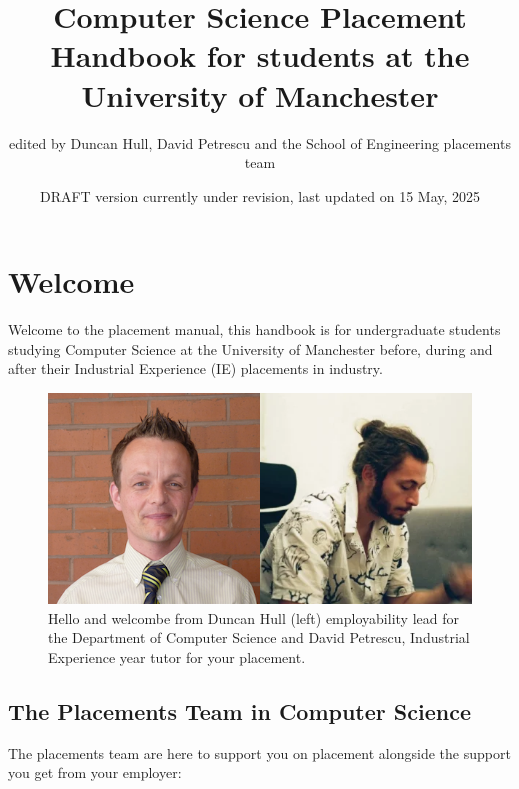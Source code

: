 \documentclass[
]{book}
\title{Computer Science Placement Handbook for students at the University of Manchester}
\author{edited by Duncan Hull, David Petrescu and the School of Engineering placements team}
\date{DRAFT version currently under revision, last updated on 15 May, 2025}
\begin{document}
\maketitle

{
\setcounter{tocdepth}{1}
\tableofcontents
}
\chapter*{Welcome}\label{welcome}

Welcome to the placement manual, this handbook is for undergraduate students studying Computer Science at the University of Manchester before, during and after their Industrial Experience (IE) placements in industry.

\begin{figure}

{\centering \includegraphics[width=0.9\linewidth]{images/duncananddavid} 

}

\caption{Hello and welcombe from Duncan Hull (left) employability lead for the Department of Computer Science and David Petrescu, Industrial Experience year tutor for your placement.}\label{fig:team-fig}
\end{figure}



\section{The Placements Team in Computer Science}\label{team}

The placements team are here to support you on placement alongside the support you get from your employer:
\end{document}

